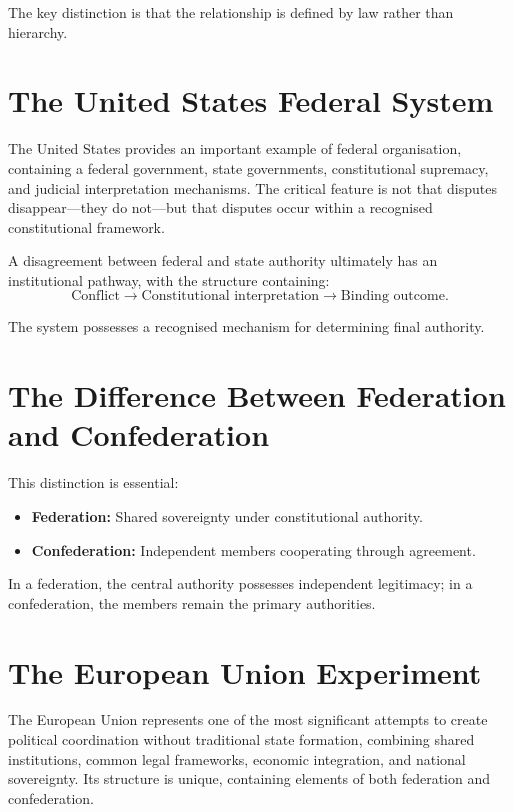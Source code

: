 \documentclass[11pt,openany]{book}
\theoremstyle{plain}
\theoremstyle{definition}
\begin{document}
The key distinction is that the relationship is defined by law rather than hierarchy.

\section*{The United States Federal System}

The United States provides an important example of federal organisation, containing a federal government, state governments, constitutional supremacy, and judicial interpretation mechanisms. The critical feature is not that disputes disappear—they do not—but that disputes occur within a recognised constitutional framework.

A disagreement between federal and state authority ultimately has an institutional pathway, with the structure containing:
\[
\text{Conflict}
\longrightarrow
\text{Constitutional interpretation}
\longrightarrow
\text{Binding outcome}.
\]

The system possesses a recognised mechanism for determining final authority.

\section*{The Difference Between Federation and Confederation}

This distinction is essential:

\begin{itemize}
    \item \textbf{Federation:} Shared sovereignty under constitutional authority.
    \item \textbf{Confederation:} Independent members cooperating through agreement.
\end{itemize}

In a federation, the central authority possesses independent legitimacy; in a confederation, the members remain the primary authorities.

\section*{The European Union Experiment}

The European Union represents one of the most significant attempts to create political coordination without traditional state formation, combining shared institutions, common legal frameworks, economic integration, and national sovereignty. Its structure is unique, containing elements of both federation and confederation.
\end{document}
